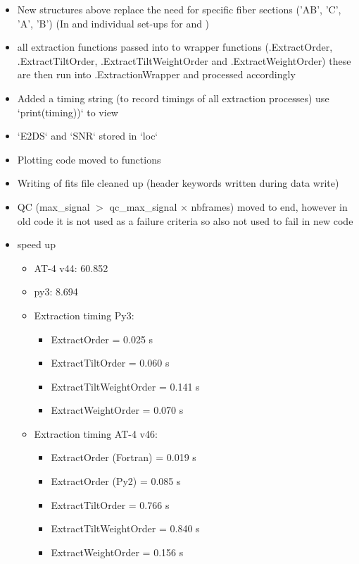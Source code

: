 \begin{itemize}
\item New structures above replace the need for specific fiber sections ('AB', 'C', 'A', 'B') (In \calextractRAWALL and individual set-ups for \calextractRAWAB and \calextractRAWC)

\item all extraction functions passed into \spirouEXTOR to wrapper functions (\spirouEXTOR.ExtractOrder, \spirouEXTOR.ExtractTiltOrder, \spirouEXTOR.ExtractTiltWeightOrder and \spirouEXTOR.ExtractWeightOrder) these are then run into \spirouEXTOR.ExtractionWrapper and processed accordingly

\item Added a timing string (to record timings of all extraction processes) use `print(timing))` to view
    
\item `E2DS` and `SNR` stored in `loc`

\item Plotting code moved to \spirouPlot functions

\item Writing of fits file cleaned up (header keywords written during data write)

\item QC (max\_signal $>$ qc\_max\_signal $\times$ nbframes) moved to end, however in old code it is not used as a failure criteria so also not used to fail in new code

\item speed up
	\begin{itemize}
	\item AT-4 v44: 60.852
	\item py3: 8.694

	\item Extraction timing Py3:
		\begin{itemize}
		\item ExtractOrder = 0.025 s
		\item ExtractTiltOrder = 0.060 s
		\item ExtractTiltWeightOrder = 0.141 s
		\item ExtractWeightOrder = 0.070 s
         \end{itemize}

	\item Extraction timing AT-4 v46:
		\begin{itemize}
		\item ExtractOrder (Fortran) = 0.019 s
		\item ExtractOrder (Py2) = 0.085 s
		\item ExtractTiltOrder = 0.766 s
		\item ExtractTiltWeightOrder = 0.840 s
		\item ExtractWeightOrder = 0.156 s
         \end{itemize}


\end{itemize}
\end{itemize}
